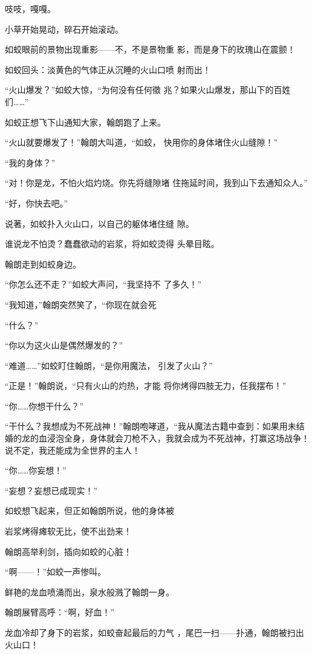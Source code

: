 \documentclass{article}
\begin{document}
吱吱，嘎嘎。 


小草开始晃动，碎石开始滚动。 

如蛟眼前的景物出现重影——不，不是景物重
影，而是身下的玫瑰山在震颤！ 

如蛟回头：淡黄色的气体正从沉睡的火山口喷
射而出！ 

“火山爆发？”如蛟大惊，“为何没有任何徵
兆？如果火山爆发，那山下的百姓们……” 


如蛟正想飞下山通知大家，翰朗跑了上来。 

“火山就要爆发了！”翰朗大叫道，“如蛟，
快用你的身体堵住火山缝隙！” 

\newpage


“我的身体？” 

“对！你是龙，不怕火焰灼烧。你先将缝隙堵
住拖延时间，我到山下去通知众人。” 


“好，你快去吧。” 

说著，如蛟扑入火山口，以自己的躯体堵住缝
隙。 

谁说龙不怕烫？蠢蠢欲动的岩浆，将如蛟烫得
头晕目眩。 


翰朗走到如蛟身边。 

“你怎么还不走？”如蛟大声问，“我坚持不
了多久！” 

“我知道，”翰朗突然笑了，“你现在就会死


\newpage

“什么？” 


“你以为这火山是偶然爆发的？” 

“难道……”如蛟盯住翰朗，“是你用魔法，
引发了火山？” 

“正是！”翰朗说，“只有火山的灼热，才能
将你烤得四肢无力，任我摆布！” 


“你……你想干什么？” 

“干什么？我想成为不死战神！”翰朗咆哮道，“我从魔法古籍中查到：如果用未结婚的龙的血浸泡全身，身体就会刀枪不入，我就会成为不死战神，打赢这场战争！说不定，我还能成为全世界的主人！


“你……你妄想！” 


“妄想？妄想已成现实！” 

如蛟想飞起来，但正如翰朗所说，他的身体被
\newpage

岩浆烤得瘫软无比，使不出劲来！ 


翰朗高举利剑，插向如蛟的心脏！ 


“啊——！”如蛟一声惨叫。 

鲜艳的龙血喷涌而出，泉水般溅了翰朗一身。


翰朗展臂高呼：“啊，好血！” 

龙血冷却了身下的岩浆，如蛟奋起最后的力气
，尾巴一扫——扑通，翰朗被扫出火山口！ 
\end{document}
